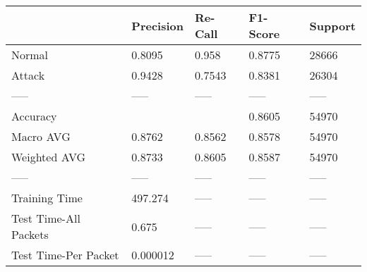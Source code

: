 \begin{tabular}{lllll}
\toprule
{} & Precision & Re-Call & F1-Score & Support \\
\midrule
Normal                &    0.8095 &   0.958 &   0.8775 &   28666 \\
Attack                &    0.9428 &  0.7543 &   0.8381 &   26304 \\
-----                 &     ----- &   ----- &    ----- &   ----- \\
Accuracy              &           &         &   0.8605 &   54970 \\
Macro AVG             &    0.8762 &  0.8562 &   0.8578 &   54970 \\
Weighted AVG          &    0.8733 &  0.8605 &   0.8587 &   54970 \\
-----                 &     ----- &   ----- &    ----- &   ----- \\
Training Time         &   497.274 &   ----- &    ----- &   ----- \\
Test Time-All Packets &     0.675 &   ----- &    ----- &   ----- \\
Test Time-Per Packet  &  0.000012 &   ----- &    ----- &   ----- \\
\bottomrule
\end{tabular}
